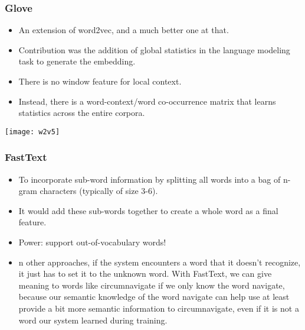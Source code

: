


\begin{frame}[fragile]\frametitle{Glove}
  \begin{itemize}
    \item An extension of word2vec, and a much better one at that.
	\item Contribution was the addition of global statistics in the language modeling task to generate the embedding. 
	\item There is no window feature for local context. 
	\item Instead, there is a word-context/word co-occurrence matrix that learns statistics across the entire corpora.
  \end{itemize}
  
\begin{center}
\texttt{[image: w2v5]}
\end{center}
  
\end{frame}

\begin{frame}[fragile]\frametitle{FastText}
  \begin{itemize}
    \item To incorporate sub-word information by splitting all words into a bag of n-gram characters (typically of size 3-6). 
	\item It would add these sub-words together to create a whole word as a final feature. 
	\item Power: support out-of-vocabulary words! 
	\item n other approaches, if the system encounters a word that it doesn’t recognize, it just has to set it to the unknown word. With FastText, we can give meaning to words like circumnavigate if we only know the word navigate, because our semantic knowledge of the word navigate can help use at least provide a bit more semantic information to circumnavigate, even if it is not a word our system learned during training.
  \end{itemize}
  
 
\end{frame}

